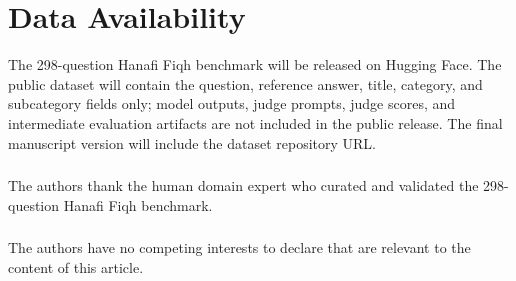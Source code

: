 \documentclass[runningheads]{llncs}
\begin{document}
\section{Data Availability}

The 298-question Hanafi Fiqh benchmark will be released on Hugging Face. The public dataset will contain the question, reference answer, title, category, and subcategory fields only; model outputs, judge prompts, judge scores, and intermediate evaluation artifacts are not included in the public release. The final manuscript version will include the dataset repository URL.

\begin{credits}
\subsubsection{\ackname} The authors thank the human domain expert who curated and validated the 298-question Hanafi Fiqh benchmark.

\subsubsection{\discintname} The authors have no competing interests to declare that are relevant to the content of this article.
\end{credits}



\end{document}
